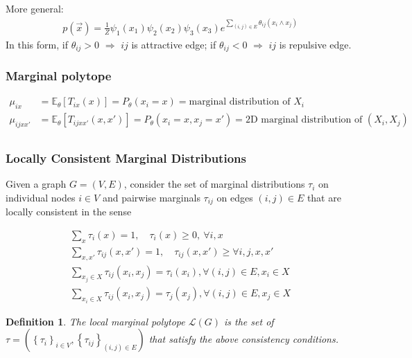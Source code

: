 \documentclass[11pt,a4paper]{article}
\newtheorem{definition}{Definition}
\begin{document}
More general:
\begin{equation}
    \begin{aligned}
        p(\vec{x})=\frac{1}{Z}\psi_1(x_1)\psi_2(x_2)\psi_3(x_3)e^{\sum_{(i,j)\in E}\theta_{ij} (x_i\land x_j)}
    \end{aligned}
    \nonumber
\end{equation}
In this form, if $\theta_{ij}>0$ $\Rightarrow$ $ij$ is attractive edge; if $\theta_{ij}<0$ $\Rightarrow$ $ij$ is repulsive edge.




\subsubsection{Marginal polytope}
\begin{equation}
    \begin{aligned}
        \mu_{ix}&=\mathbb{E}_\theta[T_{ix}(x)]=P_\theta(x_i=x)=\text{marginal distribution of }X_i\\
        \mu_{ijxx'}&=\mathbb{E}_\theta[T_{ijxx'}(x,x')]=P_\theta(x_i=x,x_j=x')=\text{2D marginal distribution of }(X_i,X_j)\\
    \end{aligned}
    \nonumber
\end{equation}


\subsubsection{Locally Consistent Marginal Distributions}
Given a graph $G = (V,E)$, consider the set of marginal distributions $\tau_i$ on individual nodes $i \in V$ and pairwise marginals $\tau_{ij}$ on edges $(i, j) \in E$ that are locally consistent in the sense

\begin{equation}
    \begin{aligned}
        \sum_x \tau_i(x)=1,\quad \tau_i(x)\geq 0,\ \forall i,x\\
        \sum_{x,x'}\tau_{ij}(x,x')=1,\quad \tau_{ij}(x,x')\geq \forall i,j,x,x'\\
        \sum_{x_j\in X}\tau_{ij}(x_i,x_j)=\tau_i(x_i), \forall (i,j)\in E, x_i\in X\\
        \sum_{x_i\in X}\tau_{ij}(x_i,x_j)=\tau_j(x_j), \forall (i,j)\in E, x_j\in X
    \end{aligned}
    \nonumber
\end{equation}

\begin{definition}
    The local marginal polytope $\mathcal{L}(G)$ is the set of $\tau=\left(\left\{\tau_i\right\}_{i \in V},\left\{\tau_{i j}\right\}_{(i, j) \in E}\right)$ that satisfy the above consistency conditions.
\end{definition}
\end{document}
